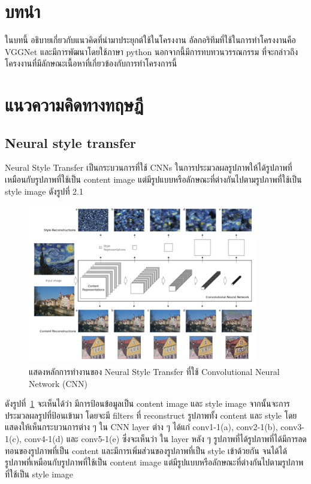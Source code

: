 \documentclass[12pt,oneside,openright,a4paper]{cpe-thai-project}
\begin{document}
\section{บทนำ}
\par\setlength{\parindent}{5ex}ในบทนี้ อธิบายเกี่ยวกับแนวคิดที่นำมาประยุกต์ใช้ในโครงงาน อัลกอริทึมที่ใช้ในการทำโครงงานคือ VGGNet และมีการพัฒนาโดยใช้ภาษา python นอกจากนี้มีการทบทวนวรรณกรรม ที่จะกล่าวถึงโครงงานที่มีลักษณะเนื้อหาที่เกี่ยวข้องกับการทำโครงการนี้

\section{แนวความคิดทางทฤษฎี}
\subsection{Neural style transfer}
\par\setlength{\parindent}{5ex}Neural Style Transfer \cite{saha2018comprehensive} เป็นกระบวนการที่ใช้ CNNs ในการประมวลผลรูปภาพให้ได้รูปภาพที่เหมือนกับรูปภาพที่ใช้เป็น content image แต่มีรูปแบบหรือลักษณะที่ต่างกันไปตามรูปภาพที่ใช้เป็น style image ดังรูปที่ 2.1


\begin{figure}[!h]
  \centering
  \includegraphics[width=10cm]{./image/unit1.png}
  \caption{แสดงหลักการทำงานของ Neural Style Transfer ที่ใช้ Convolutional Neural Network (CNN) \cite{gatys2015neural} }
  \label{fig:modelcnn}
\end{figure}

\par\setlength{\parindent}{5ex}
ดังรูปที่~\ref{fig:modelcnn} จะเห็นได้ว่า มีการป้อนข้อมูลเป็น content image และ style image 
จากนั้นจะการประมวลผลรูปที่ป้อนเข้ามา โดยจะมี filters ที่ reconstruct 
รูปภาพทั้ง content และ style โดยแสดงให้เห็นกระบวนการต่าง ๆ ใน CNN layer ต่าง ๆ 
ได้แก่ conv1-1(a), conv2-1(b), conv3-1(c), conv4-1(d) และ conv5-1(e) 
ซึ่งจะเห็นว่า ใน layer หลัง ๆ รูปภาพที่ได้รูปภาพที่ได้มีการลดทอนของรูปภาพที่เป็น content 
และมีการเพิ่มส่วนของรูปภาพที่เป็น style เข้าด้วยกัน จนได้ได้รูปภาพที่เหมือนกับรูปภาพที่ใช้เป็น content image 
แต่มีรูปแบบหรือลักษณะที่ต่างกันไปตามรูปภาพที่ใช้เป็น style image
\end{document}
